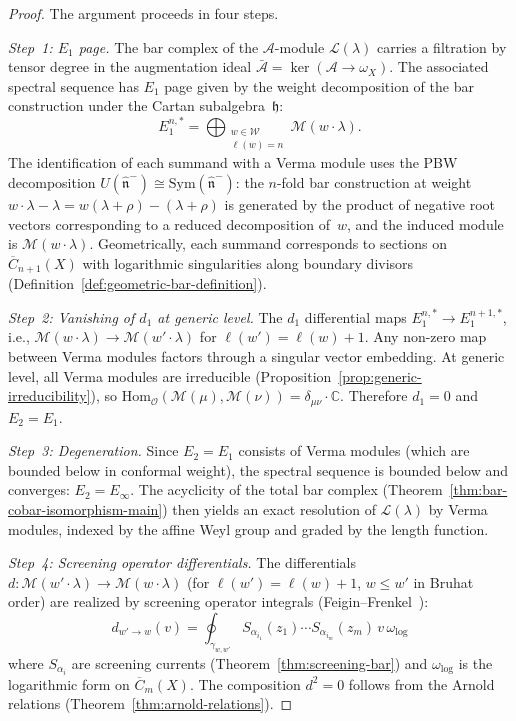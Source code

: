 \begin{proof}
The argument proceeds in four steps.

\emph{Step~1: $E_1$ page.}
The bar complex of the $\mathcal{A}$-module
$\mathcal{L}(\lambda)$ carries a filtration by tensor degree
in the augmentation ideal
$\bar{\mathcal{A}} = \ker(\mathcal{A} \to \omega_X)$. The
associated spectral sequence has $E_1$ page given by the weight
decomposition of the bar construction under the Cartan
subalgebra~$\mathfrak{h}$:
\[
E_1^{n,*} = \bigoplus_{\substack{w \in \mathcal{W} \\
\ell(w) = n}} \mathcal{M}(w \cdot \lambda).
\]
The identification of each summand with a Verma module uses the
PBW decomposition
$U(\widehat{\mathfrak{n}}^-) \cong
\mathrm{Sym}(\widehat{\mathfrak{n}}^-)$:
the $n$-fold bar construction at weight
$w \cdot \lambda - \lambda = w(\lambda + \rho) - (\lambda + \rho)$
is generated by the product of negative root vectors corresponding
to a reduced decomposition of~$w$, and the induced module is
$\mathcal{M}(w \cdot \lambda)$. Geometrically, each summand
corresponds to sections on $\overline{C}_{n+1}(X)$ with logarithmic
singularities along boundary divisors
(Definition~\ref{def:geometric-bar-definition}).

\emph{Step~2: Vanishing of $d_1$ at generic level.}
The $d_1$ differential maps
$E_1^{n,*} \to E_1^{n+1,*}$, i.e.,
$\mathcal{M}(w \cdot \lambda) \to \mathcal{M}(w' \cdot \lambda)$
for $\ell(w') = \ell(w) + 1$. Any non-zero map between Verma
modules factors through a singular vector embedding. At generic
level, all Verma modules are irreducible
(Proposition~\ref{prop:generic-irreducibility}), so
$\mathrm{Hom}_{\mathcal{O}}(\mathcal{M}(\mu),
\mathcal{M}(\nu)) = \delta_{\mu\nu} \cdot \mathbb{C}$.
Therefore $d_1 = 0$ and $E_2 = E_1$.

\emph{Step~3: Degeneration.}
Since $E_2 = E_1$ consists of Verma modules (which are
bounded below in conformal weight), the spectral sequence is
bounded below and converges: $E_2 = E_\infty$.
The acyclicity of the total bar complex
(Theorem~\ref{thm:bar-cobar-isomorphism-main})
then yields an exact resolution of $\mathcal{L}(\lambda)$ by
Verma modules, indexed by the affine Weyl group and graded
by the length function.

\emph{Step~4: Screening operator differentials.}
The differentials
$d\colon \mathcal{M}(w' \cdot \lambda) \to
\mathcal{M}(w \cdot \lambda)$
(for $\ell(w') = \ell(w) + 1$, $w \leq w'$ in Bruhat order)
are realized by screening operator integrals
(Feigin--Frenkel~\cite{FF}):
\[
d_{w' \to w}(v) = \oint_{\gamma_{w,w'}}
S_{\alpha_{i_1}}(z_1) \cdots S_{\alpha_{i_m}}(z_m)\,
v\, \omega_{\log}
\]
where $S_{\alpha_i}$ are screening currents
(Theorem~\ref{thm:screening-bar}) and
$\omega_{\log}$ is the logarithmic form on $\overline{C}_m(X)$.
The composition $d^2 = 0$ follows from the Arnold relations
(Theorem~\ref{thm:arnold-relations}).
\end{proof}


